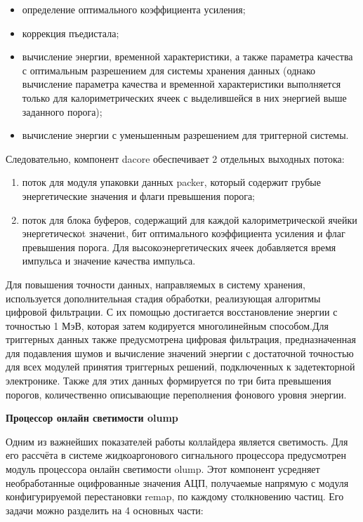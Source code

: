 \begin{itemize}
    \item определение оптимального коэффициента усиления;
    \item коррекция пъедистала;
    \item вычисление энергии, временной характеристики, а также параметра качества с оптимальным разрешением для системы хранения данных (однако вычисление параметра качества и временной характеристики выполняется только для калориметрических ячеек с выделившейся в них энергией выше заданного порога);
    \item вычисление энергии с уменьшенным разрешением для триггерной системы.
\end{itemize}\par
Следовательно, компонент dacore обеспечивает 2 отдельных выходных потока:\par
\begin{enumerate}
    \item поток для модуля упаковки данных packer, который содержит грубые энергетические значения и флаги превышения порога;
    \item поток для блока буферов, содержащий для каждой калориметрической ячейки энергетическоt значениt, бит оптимального коэффициента усиления и флаг превышения порога. Для высокоэнергетических ячеек добавляется время импульса и значение качества импульса.
\end{enumerate}\par
Для повышения точности данных, направляемых в систему хранения, используется дополнительная стадия обработки, реализующая алгоритмы цифровой фильтрации. С их помощью достигается восстановление энергии с точностью 1 МэВ, которая затем кодируется многолинейным способом.Для триггерных данных также предусмотрена цифровая фильтрация, предназначенная для подавления шумов и вычисление значений энергии с достаточной точностью для всех модулей принятия триггерных решений, подключенных к задетекторной электронике. Также для этих данных формируется по три бита превышения порогов, количественно описывающие переполнения фонового уровня энергии.\par
\textbf{Процессор онлайн светимости olump}\par
Одним из важнейших показателей работы коллайдера является светимость. Для его рассчёта в системе жидкоаргонового сигнального процессора предусмотрен модуль процессора онлайн светимости olump. Этот компонент усредняет необработанные оцифрованные значения АЦП, получаемые напрямую с модуля конфигурируемой перестановки remap, по каждому столкновению частиц. Его задачи можно разделить на 4 основных части:\par
